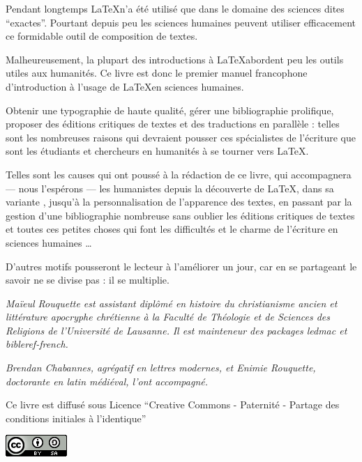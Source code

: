 \thispagestyle{empty}

Pendant longtemps \LaTeX n'a été utilisé que dans le domaine des sciences dites \enquote{exactes}.
Pourtant depuis peu les sciences humaines peuvent utiliser efficacement ce formidable outil de composition de textes.


Malheureusement, la plupart des introductions à \LaTeX abordent peu les outils utiles aux humanités. Ce livre est donc le premier manuel francophone d'introduction à l'usage de \LaTeX en sciences humaines.

Obtenir une typographie de haute qualité, gérer une bibliographie prolifique, proposer des éditions critiques de textes et des traductions en parallèle : telles sont les nombreuses raisons qui devraient pousser ces spécialistes de l'écriture que sont les étudiants et chercheurs en humanités à se tourner vers \LaTeX.

Telles sont les causes qui ont poussé à la rédaction de ce livre, qui accompagnera --- nous l'espérons --- les humanistes depuis la découverte de \LaTeX, dans sa variante \XeLaTeX, jusqu'à la personnalisation de l'apparence des textes, en passant par la gestion d'une bibliographie nombreuse sans oublier les éditions critiques de textes et toutes ces petites choses qui font les difficultés et le charme de l'écriture en sciences humaines \ldots

D'autres motifs pousseront le lecteur à l'améliorer un jour, car en se partageant le savoir ne se divise pas : il se multiplie.

\vspace{4ex}

\scriptsize
\emph{
Maïeul Rouquette est assistant diplômé en histoire du christianisme ancien et littérature apocryphe chrétienne à la Faculté de Théologie et de Sciences des Religions de l'Université de Lausanne.} 
\emph{Il est mainteneur des packages \emph{ledmac} et \emph{bibleref-french}.}


\emph{Brendan Chabannes, agrégatif en lettres modernes, et Enimie Rouquette, doctorante en latin médiéval, l'ont accompagné.}

\normalsize

\vspace{4ex}
Ce livre est diffusé sous Licence \enquote{Creative Commons - Paternité - Partage des conditions initiales à l'identique}

\vspace{2ex}
 \raggedleft\includegraphics[height=3ex]{images/cc.png}
